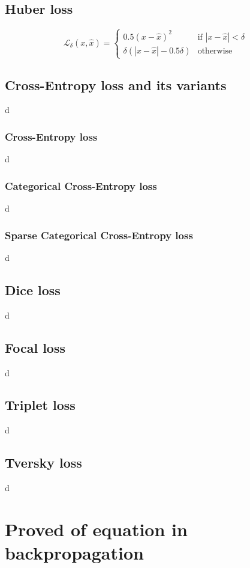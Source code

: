 \subsection{Huber loss}
\begin{equation}
    \mathcal{L}_{\delta}(x,\hat{x}) = \begin{cases}
        0.5{(x - \hat{x})}^{2} & \text{if } |x-\hat{x}| < \delta\\
        \delta (|x-\hat{x}| - 0.5\delta)& \text{otherwise}
    \end{cases}
\end{equation}
\subsection{Cross-Entropy loss and its variants}
d
\subsubsection{Cross-Entropy loss}
d
\subsubsection{Categorical Cross-Entropy loss}
d
\subsubsection{Sparse Categorical Cross-Entropy loss}
d
\subsection{Dice loss}
d
\subsection{Focal loss}
d
\subsection{Triplet loss}
d
\subsection{Tversky loss}
d
\section{Proved of equation in backpropagation}